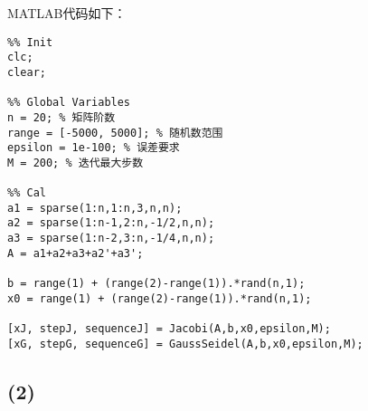 \documentclass{article}
\begin{document}
MATLAB代码如下：
\begin{lstlisting}
%% Init
clc;
clear;

%% Global Variables
n = 20; % 矩阵阶数
range = [-5000, 5000]; % 随机数范围
epsilon = 1e-100; % 误差要求
M = 200; % 迭代最大步数

%% Cal
a1 = sparse(1:n,1:n,3,n,n);
a2 = sparse(1:n-1,2:n,-1/2,n,n);
a3 = sparse(1:n-2,3:n,-1/4,n,n);
A = a1+a2+a3+a2'+a3';

b = range(1) + (range(2)-range(1)).*rand(n,1);
x0 = range(1) + (range(2)-range(1)).*rand(n,1);

[xJ, stepJ, sequenceJ] = Jacobi(A,b,x0,epsilon,M);
[xG, stepG, sequenceG] = GaussSeidel(A,b,x0,epsilon,M);
\end{lstlisting}
\subsection{(2)}
\end{document}
